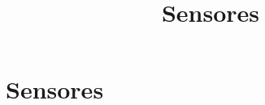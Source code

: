 \documentclass[compress]{beamer}
\title{Sensores}
\author{}
\institute{Universidad Nacional de Rosario}
\date{}
\begin{document}
\frame{\titlepage}

\section{Sensores}





















\end{document}
